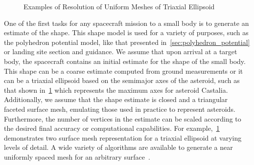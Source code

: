 \begin{figure}[htbp]
    \centering
    \caption{Examples of Resolution of Uniform Meshes of Triaxial Ellipsoid~\label{fig:uniform_mesh}}
\end{figure}

One of the first tasks for any spacecraft mission to a small body is to generate an estimate of the shape.
This shape model is used for a variety of purposes, such as the polyhedron potential model, like that presented in~\cref{sec:polyhedron_potential} or landing site section and guidance.
We assume that upon arrival at a target body, the spacecraft contains an initial estimate for the shape of the small body.
This shape can be a coarse estimate computed from ground measurements or it can be a triaxial ellipsoid based on the semimajor axes of the asteroid, such as that shown in~\cref{fig:uniform_mesh} which represents the maximum axes for asteroid Castalia.
Additionally, we assume that the shape estimate is closed and a triangular faceted surface mesh, emulating those used in practice to represent asteroids.
Furthermore, the number of vertices in the estimate can be scaled according to the desired final accuracy or computational capabilities.
For example,~\cref{fig:uniform_mesh} demonstrates two surface mesh representation for a triaxial ellipsoid at varying levels of detail. 
A wide variety of algorithms are available to generate a near uniformly spaced mesh for an arbitrary surface~\cite{persson2004,boissonnat2005}.

